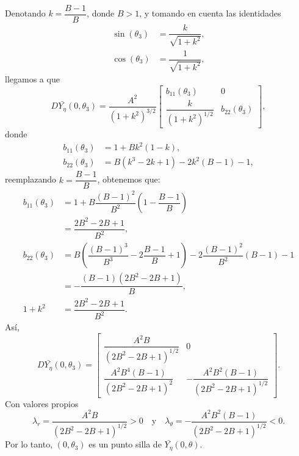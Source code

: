 Denotando $k = \dfrac{B-1}{B}$, donde $B>1$, y tomando en cuenta las identidades
\begin{equation*}
	\begin{aligned}
		\sin(\theta_3) &= \dfrac{k}{\sqrt{1+k^{2}}}, \\
		\cos(\theta_3) &= \dfrac{1}{\sqrt{1+k^{2}}},
	\end{aligned}
\end{equation*}
llegamos a que
\begin{equation*}
	D\bar{Y_{\eta}}(0,\theta_3) = \dfrac{A^{2}}{(1+k^{2})^{3/2}}
	\begin{bmatrix}
		b_{11}(\theta_3) & 0 \\
		\dfrac{k}{(1+k^{2})^{1/2}} & b_{22}(\theta_3)
	\end{bmatrix},
\end{equation*}
donde
\begin{equation*}
	\begin{aligned}
		b_{11}(\theta_3) &= 1 + Bk^{2}(1-k), \\
		b_{22}(\theta_3) &= B(k^{3}-2k+1) -2k^{2}(B-1) - 1,
	\end{aligned}
\end{equation*}
reemplazando $k = \dfrac{B-1}{B}$, obtenemos que:
\begin{equation*}
	\begin{aligned}
		b_{11}(\theta_3) &= 1 + B\dfrac{(B-1)^{2}}{B^{2}}\left(1-\dfrac{B-1}{B}\right) \\ 
		&=\dfrac{2B^{2}-2B+1}{B^{2}}, \\
		b_{22}(\theta_3) &= B\left(\dfrac{(B-1)^{3}}{B^{3}}-2\dfrac{B-1}{B}+1\right) -2\dfrac{(B-1)^{2}}{B^{2}}(B-1) - 1 \\ 
		&= -\dfrac{(B-1)(2B^{2}-2B+1)}{B}, \\
		1+k^{2} &= \dfrac{2B^{2}-2B+1}{B^{2}}.
	\end{aligned}
\end{equation*}
Así,
\begin{equation}
	D\bar{Y_{\eta}}\left(0,\theta_3\right) =
	\begin{bmatrix}
		\dfrac{A^2 B}{(2B^{2}-2B+1)^{1/2}} & 0 \\
		\dfrac{A^2 B^4 (B-1)}{(2B^{2}-2B+1)^{2}} & -\dfrac{A^2 B^2 (B-1)}{(2B^{2}-2B+1)^{1/2}}
	\end{bmatrix}.
	\label{eq:jacobianaModelo2PolarEn(0,b)}
\end{equation}
Con valores propios $$\lambda_r = \dfrac{A^2 B}{(2B^{2}-2B+1)^{1/2}}>0 \quad \text{y} \quad \lambda_\theta = -\dfrac{A^2 B^2 (B-1)}{(2B^{2}-2B+1)^{1/2}}<0.$$ Por lo tanto, $(0,\theta_3)$ es un punto silla de $\bar{Y_{\eta}}(0,\theta)$. \\

